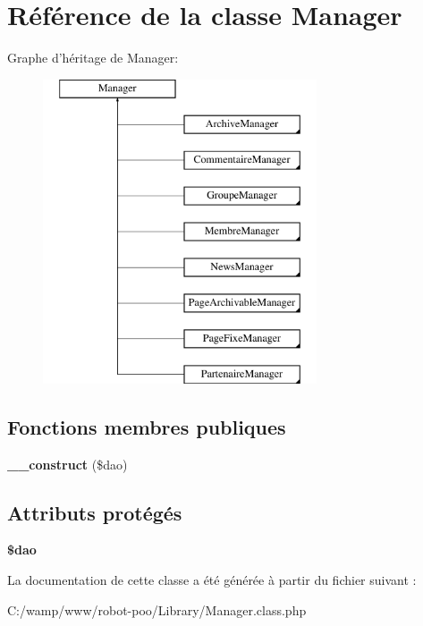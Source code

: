 \hypertarget{class_library_1_1_manager}{\section{Référence de la classe Manager}
\label{class_library_1_1_manager}
}
Graphe d'héritage de Manager\+:\begin{figure}[H]
\begin{center}
\leavevmode
\includegraphics[height=9.000000cm]{class_library_1_1_manager}
\end{center}
\end{figure}
\subsection*{Fonctions membres publiques}
\begin{DoxyCompactItemize}
\item 
\hypertarget{class_library_1_1_manager_a40bde8414a50cbcd818d324addd79bb8}{{\bfseries \+\_\+\+\_\+construct} (\$dao)}\label{class_library_1_1_manager_a40bde8414a50cbcd818d324addd79bb8}

\end{DoxyCompactItemize}
\subsection*{Attributs protégés}
\begin{DoxyCompactItemize}
\item 
\hypertarget{class_library_1_1_manager_ae912a0b57d8a8d02c49652e6a3322dd2}{{\bfseries \$dao}}\label{class_library_1_1_manager_ae912a0b57d8a8d02c49652e6a3322dd2}

\end{DoxyCompactItemize}


La documentation de cette classe a été générée à partir du fichier suivant \+:\begin{DoxyCompactItemize}
\item 
C\+:/wamp/www/robot-\/poo/\+Library/Manager.\+class.\+php\end{DoxyCompactItemize}
